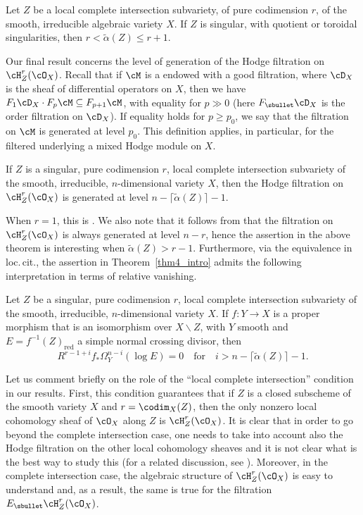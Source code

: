 \begin{cor}
Let $Z$ be a local complete intersection subvariety, of pure codimension $r$, of the smooth, irreducible algebraic variety $X$. If $Z$ is singular,
with quotient or toroidal singularities, then $r<\widetilde{\alpha}(Z)\leq r+1$.
\end{cor}

Our final result concerns the level of generation of the Hodge filtration on
$\cH^r_Z(\cO_X)$. Recall that if $\cM$ is a \DXmodule endowed with a good filtration, where $\cD_X$ is the sheaf of differential operators on $X$, then we have
$F_1\cD_X\cdot F_p\cM\subseteq F_{p+1}\cM$, with equality for $p\gg 0$ (here $F_{\sbullet}\cD_X$ is the order filtration on $\cD_X$). If equality
holds for $p\geq p_0$, we say that the filtration on $\cM$ is generated at level $p_0$. This definition applies, in particular, for the filtered \DXmodule
underlying a mixed Hodge module on $X$.

\begin{thm}\label{thm4_intro}
If $Z$ is a singular, pure codimension $r$, local complete intersection subvariety of the smooth, irreducible, $n$-dimensional variety $X$, then the Hodge filtration
on $\cH^r_Z(\cO_X)$ is generated at level $n-\lceil\widetilde{\alpha}(Z)\rceil-1$.
\end{thm}

When $r=1$, this is \cite[Th.\,A]{MP0}.
We also note that it follows from \cite[Th.\,4.2]{MP1} that the filtration on $\cH^r_Z(\cO_X)$ is always generated at level $n-r$, hence the assertion in the above theorem is interesting when $\widetilde{\alpha}(Z)>r-1$. Furthermore, via the equivalence in loc.\,cit., the assertion in Theorem~\ref{thm4_intro}
admits the following interpretation in terms of relative vanishing.\enlargethispage{\baselineskip}%

\begin{thm}\label{thm5_intro}
Let $Z$ be a singular, pure codimension $r$, local complete intersection subvariety of the smooth, irreducible, $n$-dimensional variety $X$. If $f\colon Y\to X$
is a proper morphism that is an isomorphism over $X\smallsetminus Z$, with $Y$ smooth and $E=f^{-1}(Z)_\mathrm{red}$ a simple normal crossing divisor, then
\[R^{r-1+i}f_*\Omega_Y^{n-i}(\log E)=0\quad\text{for}\quad i>n-\lceil\widetilde{\alpha}(Z)\rceil-1.\]
\end{thm}

Let us comment briefly on the role of the ``local complete intersection'' condition in our results. First, this condition guarantees that if $Z$ is a closed subscheme
of the smooth variety $X$ and $r=\codim_X(Z)$, then the only nonzero local cohomology sheaf of $\cO_X$ along $Z$ is $\cH^r_Z(\cO_X)$. It is clear that in order to
go beyond the complete intersection case, one needs to take into account also the Hodge filtration on the other local cohomology sheaves and it is not clear what is the best way to study this (for a related discussion,
see \cite[\S 3]{MP1}). Moreover, in the complete intersection case, the
algebraic structure of $\cH^r_Z(\cO_X)$ is easy to understand and, as a result, the same is true for the filtration $E_{\sbullet}\cH^r_Z(\cO_X)$.

